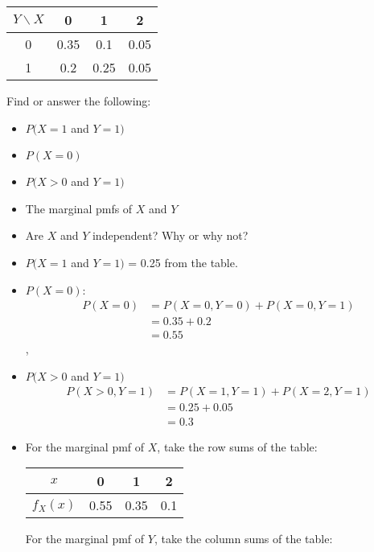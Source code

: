 \documentclass{article}
\numberwithin{equation}{section}
\begin{document}
\begin{flushleft}
\begin{enumerate}[1. ]
\begin{center}
\begin{tabular}{cccc}
 $Y \backslash X$ & 0 & 1 & 2 \\ \hline
 0 & 0.35 & 0.1 & 0.05 \\
 1 & 0.2 & 0.25 & 0.05 \\
\end{tabular}
\end{center}

Find or answer the following:

\begin{itemize}
\item $P(X = 1$ and $ Y = 1)$
\item $P(X  = 0)$
\item $P(X > 0$ and $Y = 1)$
\item The marginal pmfs of $X$ and $Y$
\item Are $X$ and $Y$ independent? Why or why not?
\end{itemize}

{\color{red}

\begin{itemize}
\item $P(X = 1$ and $ Y = 1)$ = 0.25 from the table.
\item $P(X = 0)$:
\begin{align*}
P(X = 0) &= P(X = 0, Y = 0) + P(X = 0, Y = 1) \\
&= 0.35 + 0.2 \\
&= 0.55
\end{align*},
\item $P(X > 0$ and $Y = 1)$
\begin{align*}
P(X > 0, Y = 1) &= P(X = 1, Y = 1) + P(X = 2, Y = 1) \\
&= 0.25 + 0.05 \\
&= 0.3
\end{align*}
\item For the marginal pmf of $X$, take the row sums of the table: 

\begin{center}
\begin{tabular}{cccc}
$x$ & 0 & 1 & 2 \\ \hline
$f_X(x)$ & 0.55 & 0.35 & 0.1 
\end{tabular}
\end{center}

For the marginal pmf of $Y$, take the column sums of the table:


\end{itemize}}
\end{enumerate}
\end{flushleft}
\end{document}
